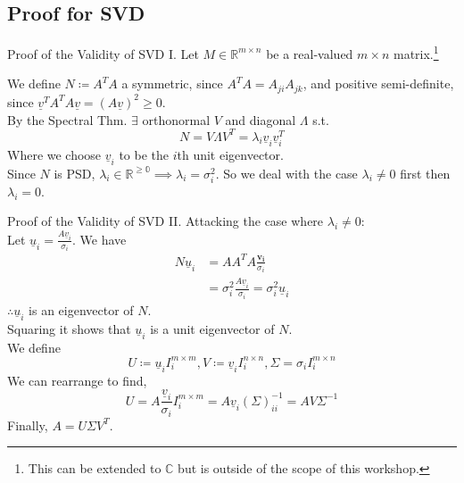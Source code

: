\documentclass{beamer}
\begin{document}
\subsection{Proof for SVD}
\begin{frame}{Proof of the Validity of SVD I.}
Let $M \in \mathbb{R}^{m\times n}$ be a real-valued $m\times n$ matrix.\footnote{This can be extended to $\mathbb{C}$ but is outside of the scope of this workshop.} \par We define $N\coloneqq A^TA$ a symmetric, since $A^TA = A_{ji}A_{jk}$, and positive semi-definite, since $\underline{v}^TA^TA\underline{v} = (A\underline{v})^2 \ge 0$.\\
By the Spectral Thm. $\exists$ orthonormal $V$ and diagonal $\Lambda$ s.t. \begin{equation}
    N=V\Lambda V^T = \lambda_i \underline{v}_i\underline{v}_i^T
\end{equation} Where we choose $\underline{v}_i$ to be the $i$th unit eigenvector. \\Since $N$ is PSD, $\lambda_i \in \mathbb{R^{\ge 0}}\implies \lambda_i=\sigma_i^2$. So we deal with the case $\lambda_i \ne 0$ first then $\lambda_i =0$.
\end{frame}
\begin{frame}{Proof of the Validity of SVD II.}
Attacking the case where $\lambda_i \ne 0$:\\
    Let $\underline{u}_i = \frac{A\underline{v}_i}{\sigma_i}$. We have\begin{align}
        N \underline{u}_i &= A A^T A\frac{\mathbf{v_i}}{\sigma_i}\\ &= \sigma_i^2 \frac{A\underline{v}_i}{\sigma_i} = \sigma_i^2 \underline{u}_i
    \end{align} $\therefore \underline{u}_i$ is an eigenvector of $N$. \\Squaring it shows that $\underline{u}_i$ is a unit eigenvector of $N$. \\
We define \begin{equation}
    U\coloneqq \underline{u}_i I_i^{m\times m},V \coloneqq \underline{v}_i I_i^{n\times n}, \Sigma = \sigma_i I_i^{m\times n}
\end{equation}We can rearrange to find,
\begin{equation}
    U=A\frac{\underline{v}_i}{\sigma_i}I_i^{m\times m} = A\underline{v}_i (\Sigma)^{-1}_{ii} = AV\Sigma^{-1}
\end{equation}
Finally, $A = U \Sigma V^T$.
\end{frame}
\end{document}
